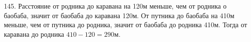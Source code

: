 145. Расстояние от родника до каравана на 120м меньше, чем от родника о баобаба, значит от баобаба до каравана 120м. От путника до баобаба на 410м меньше, чем от путника до родника, значит от баобаба до родника 410м. Тогда от каравана до родника $410-120=290$м.\\
